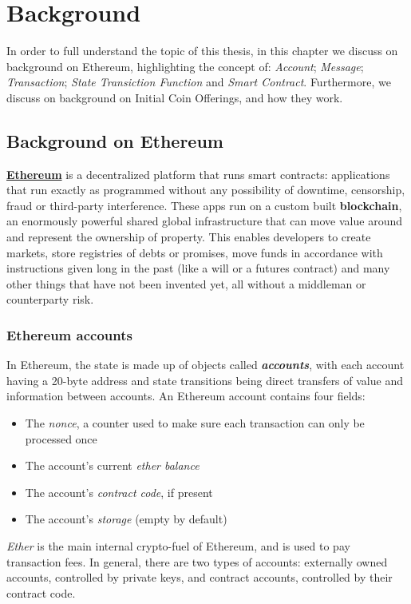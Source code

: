 \label{Chapter2}

\chapter{Background}
In order to full understand the topic of this thesis, in this chapter we discuss on background on Ethereum, highlighting the concept of: \textit{Account}; \textit{Message}; \textit{Transaction}; \textit{State Transiction Function} and \textit{Smart Contract}. Furthermore, we discuss on background on Initial Coin Offerings, and how they work.
\section{Background on Ethereum}
\href{https://www.ethereum.org}{\textbf{Ethereum}} is a decentralized platform that runs smart contracts: applications that run exactly as programmed without any possibility of downtime, censorship, fraud or third-party interference.
These apps run on a custom built \textbf{blockchain}, an enormously powerful shared global infrastructure that can move value around and represent the ownership of property.
This enables developers to create markets, store registries of debts or promises, move funds in accordance with instructions given long in the past (like a will or a futures contract) and many other things that have not been invented yet, all without a middleman or counterparty risk.
\subsection{Ethereum accounts}
In Ethereum, the state is made up of objects called \textbf{\textit{accounts}}, with each account having a 20-byte address and state transitions being direct transfers of value and information between accounts. An Ethereum account contains four fields:
\begin{itemize}
    \item The \textit{nonce}, a counter used to make sure each transaction can only be processed once
    \item The account's current \textit{ether balance}
    \item The account's \textit{contract code}, if present
    \item The account's \textit{storage} (empty by default)
\end{itemize}
\textit{Ether} is the main internal crypto-fuel of Ethereum, and is used to pay transaction fees. \newline In general, there are two types of accounts: externally owned accounts, controlled by private keys, and contract accounts, controlled by their contract code.

